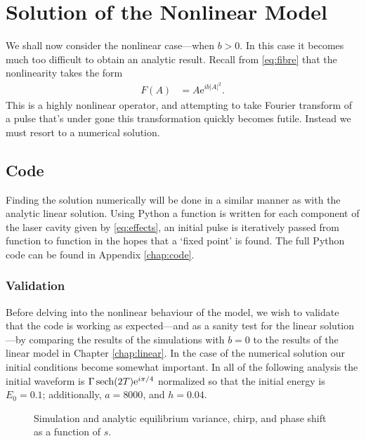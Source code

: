 
\chapter{Solution of the Nonlinear Model}
\label{chap:nl}
We shall now consider the nonlinear case---when $b > 0$. In this case it becomes much too difficult to obtain an analytic result. Recall from \eqref{eq:fibre} that the nonlinearity takes the form
\begin{align*}
F(A) &= A \textrm{e}^{i b |A|^2}.
\end{align*}
This is a highly nonlinear operator, and attempting to take Fourier transform of a pulse that's under gone this transformation quickly becomes futile. Instead we must resort to a numerical solution. \\

\section{Code}
Finding the solution numerically will be done in a similar manner as with the analytic linear solution. Using Python a function is written for each component of the laser cavity given by \eqref{eq:effects}, an initial pulse is iteratively passed from function to function in the hopes that a `fixed point' is found. The full Python code can be found in Appendix \ref{chap:code}. \\

\subsection{Validation}
Before delving into the nonlinear behaviour of the model, we wish to validate that the code is working as expected---and as a sanity test for the linear solution---by comparing the results of the simulations with $b=0$ to the results of the linear model in Chapter \ref{chap:linear}. In the case of the numerical solution our initial conditions become somewhat important. In all of the following analysis the initial waveform is $\Gamma \sech \left( 2T \right) \textrm{e}^{i \pi / 4}$ normalized so that the initial energy is $E_0 = 0.1$; additionally, $a = 8000$, and $h = 0.04$. \\
\begin{figure}[tbp]
\centering

\caption{Simulation and analytic equilibrium variance, chirp, and phase shift as a function of $s$.}
\label{fig:var}
\end{figure}

